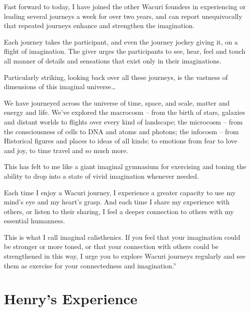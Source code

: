 \documentclass[12pt]{book}
\begin{document}
Fast forward to today, I have joined the other Wacuri founders in
experiencing or leading several journeys a week for over two years,
and can report unequivocally that repeated journeys enhance and
strengthen the imagination.

Each journey takes the participant, and even the journey jockey giving
it, on a flight of imagination. The giver urges the participants to
see, hear, feel and touch all manner of details and sensations that
exist only in their imaginations.

Particularly striking, looking back over all these journeys, is the
vastness of dimensions of this imaginal universe…

We have journeyed across the universe of time, space, and scale,
matter and energy and life. We've explored the macrocosm – from the
birth of stars, galaxies and distant worlds to flights over every kind
of landscape; the microcosm – from the consciousness of cells to DNA
and atoms and photons; the infocosm – from Historical figures and
places to ideas of all kinds; to emotions from fear to love and joy,
to time travel and so much more.

This has felt to me like a giant imaginal gymnasium for exercising and
toning the ability to drop into a state of vivid imagination whenever
needed.

Each time I enjoy a Wacuri journey, I experience a greater capacity to
use my mind’s eye and my heart’s grasp. And each time I share my
experience with others, or listen to their sharing, I feel a deeper
connection to others with my essential humanness.

This is what I call imaginal calisthenics. If you feel that your
imagination could be stronger or more toned, or that your connection
with others could be strengthened in this way, I urge you to explore
Wacuri journeys regularly and see them as exercise for your
connectedness and imagination.''


\section{Henry's Experience}
\end{document}

